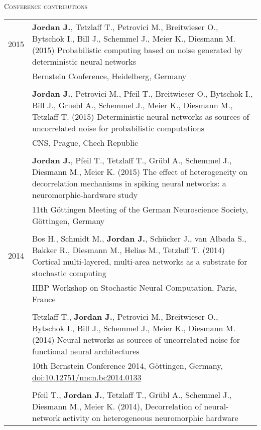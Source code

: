 \documentclass[a4paper,10pt]{article}
\begin{document}
\textsc{Conference contributions}\\[1em]
\begin{tabular}{>{\hfill}p{1.6cm} p{}}
  2015 & \textbf{Jordan J.}, Tetzlaff T., Petrovici M., Breitwieser O., Bytschok I., Bill J., Schemmel J., Meier K., Diesmann M. (2015) Probabilistic computing based on noise generated by deterministic neural networks\\
  & \footnotesize Bernstein Conference, Heidelberg, Germany\\
 \multicolumn{2}{c}{} \\
  & \textbf{Jordan J.}, Petrovici M., Pfeil T., Breitwieser O., Bytschok I., Bill J., Gruebl A., Schemmel J., Meier K., Diesmann M., Tetzlaff T. (2015) Deterministic neural networks as sources of uncorrelated noise for probabilistic computations\\
  & \footnotesize CNS, Prague, Chech Republic\\
 \multicolumn{2}{c}{} \\
  & \textbf{Jordan J.}, Pfeil T., Tetzlaff T., Gr\"ubl A., Schemmel J., Diesmann M., Meier K. (2015) The effect of heterogeneity on decorrelation mechanisms in spiking neural networks: a neuromorphic-hardware study \\
  & \footnotesize 11th G\"ottingen Meeting of the German Neuroscience Society, G\"ottingen, Germany \\
  \multicolumn{2}{c}{} \\
  2014 & Bos H., Schmidt M., \textbf{Jordan J.}, Sch\"ucker J., van Albada S., Bakker R., Diesmann M., Helias M., Tetzlaff T. (2014) Cortical multi-layered, multi-area networks as a substrate for stochastic computing \\
  & \footnotesize HBP Workshop on Stochastic Neural Computation, Paris, France \\
  \multicolumn{2}{c}{} \\
  &  Tetzlaff T., \textbf{Jordan J.}, Petrovici M., Breitwieser O., Bytschok I., Bill J., Schemmel J., Meier K., Diesmann M. (2014) Neural networks as sources of uncorrelated noise for functional neural architectures \\
  & \footnotesize 10th Bernstein Conference 2014, G\"ottingen, Germany, \href{http://dx.doi.org/10.12751/nncn.bc2014.0133}{doi:10.12751/nncn.bc2014.0133} \\
  \multicolumn{2}{c}{} \\
  & Pfeil T., \textbf{Jordan J.}, Tetzlaff T., Gr\"ubl A., Schemmel J., Diesmann M., Meier K. (2014), Decorrelation of neural-network activity on heterogeneous neuromorphic hardware \\

\end{tabular}
\end{document}
